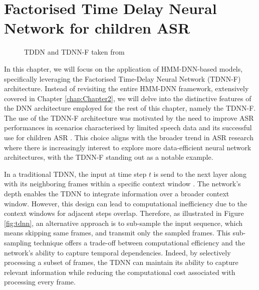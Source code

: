 \section{Factorised Time Delay Neural Network for children ASR}
\label{sec:TDNNF}
\begin{figure}[ht]
    \centering
    \caption{TDDN and TDNN-F taken from \cite{tdnnf-children}}
\end{figure}
In this chapter, we will focus on the application of HMM-DNN-based models, specifically leveraging the Factorised Time-Delay Neural Network (TDNN-F) architecture.  Instead of revisiting the entire HMM-DNN framework, extensively covered in Chapter \ref{chap:Chapter2}, we will delve into the distinctive features of the DNN architecture employed for the rest of this chapter, namely the TDNN-F. 
The use of the TDNN-F architecture was motivated by the need to improve ASR performances in scenarios characterised by limited speech data and its successful use for children ASR \cite{tdnnf-children}. This choice aligns with the broader trend in ASR research where there is increasingly interest to explore more data-efficient neural network architectures, with the TDNN-F standing out as a notable example.

In a traditional TDNN, the input at time step $t$ is send to the next layer along with its neighboring frames within a specific context window \cite{tdnn}. The network's depth enables the TDNN to integrate information over a broader context window. However, this design can lead to computational inefficiency due to the context windows for adjacent steps overlap. Therefore, as illustrated in Figure \ref{fig:tdnn}, an alternative approach is to sub-sample the input sequence, which means skipping same frames, and transmit only the sampled frames. This sub-sampling technique offers a trade-off between computational efficiency and the network's ability to capture temporal dependencies. Indeed, by selectively processing a subset of frames, the TDNN can maintain its ability to capture relevant information while reducing the computational cost associated with processing every frame.

